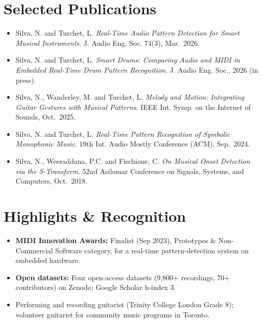 \documentclass[11pt]{article}
\begin{document}
\section*{Selected Publications \footnotesize {}}
\begin{itemize}[leftmargin=1.2em, itemsep=-0.25em]
    \item Silva, N. and Turchet, L. \textit{Real-Time Audio Pattern Detection for Smart Musical Instruments}. J. Audio Eng. Soc. 74(3), Mar.~2026.
    \item Silva, N. and Turchet, L. \textit{Smart Drums: Comparing Audio and MIDI in Embedded Real-Time Drum Pattern Recognition}. J. Audio Eng. Soc., 2026 (in press).
    \item Silva, N., Wanderley, M. and Turchet, L. \textit{Melody and Motion: Integrating Guitar Gestures with Musical Patterns}. IEEE Int. Symp. on the Internet of Sounds, Oct.~2025.
    \item Silva, N. and Turchet, L. \textit{Real-Time Pattern Recognition of Symbolic Monophonic Music}. 19th Int. Audio Mostly Conference (ACM), Sep.~2024.
    \item Silva, N., Weeraddana, P.C. and Fischione, C. \textit{On Musical Onset Detection via the S-Transform}. 52nd Asilomar Conference on Signals, Systems, and Computers, Oct.~2018.
\end{itemize}

\vspace{-0.3em}
\section*{Highlights \& Recognition}
\begin{itemize}[leftmargin=1.2em, itemsep=-0.25em]
    \item \textbf{MIDI Innovation Awards:} Finalist (Sep 2023), Prototypes \& Non-Commercial Software category, for a real-time pattern-detection system on embedded hardware.
    \item \textbf{Open datasets:} Four open-access datasets (9,800+ recordings, 70+ contributors) on Zenodo; Google Scholar h-index 3.
    \item Performing and recording guitarist (Trinity College London Grade 8); volunteer guitarist for community music programs in Toronto.
\end{itemize}
\end{document}
